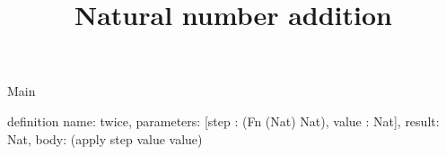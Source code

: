 \begin{lexlean}{Main}
\title{Natural number addition}
\begin{semanticmodule}
definition{
  name: twice,
  parameters: [step : (Fn (Nat) Nat), value : Nat],
  result: Nat,
  body: (apply step value value)
}
\end{semanticmodule}
\end{lexlean}
